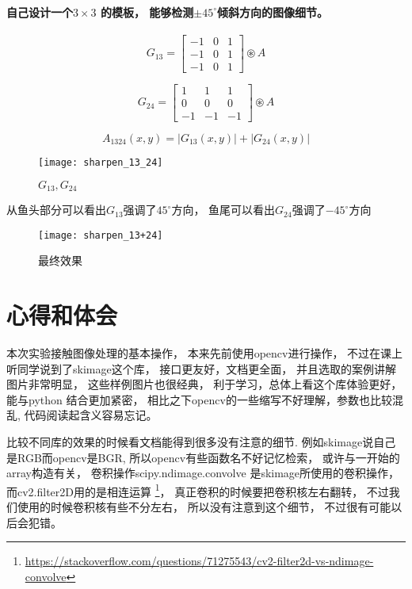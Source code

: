 \documentclass{myreport}
\begin{document}
      \paragraph{自己设计一个$3 \times 3$ 的模板，
        能够检测$ \pm 45^\circ$倾斜方向的图像细节。}
        $$
          G_{13} = \begin{bmatrix}
              -1 & 0 & 1 \\
              -1 & 0 & 1 \\
              -1 & 0 & 1
          \end{bmatrix}
          \circledast A 
        $$
        
        $$
          G_{24} = \begin{bmatrix}
              1 & 1 & 1 \\
              0 & 0 & 0 \\
              -1 & -1 & -1
          \end{bmatrix}
          \circledast A 
        $$
        
        $$
          A_{1324}(x,y) = |G_{13}(x,y)| + |G_{24}(x,y)| 
        $$



        \begin{figure}[H]
          \centering
          \texttt{[image: sharpen\_13\_24]}
          \caption{$G_{13}, G_{24}$}
          \label{fig:sharpen_13_24}
        \end{figure}
        从鱼头部分可以看出$G_{13}$强调了$45^\circ$方向，
        鱼尾可以看出$G_{24}$强调了$-45^\circ$方向

        \begin{figure}[H]
          \centering
          \texttt{[image: sharpen\_13+24]}
          \caption{最终效果}
          \label{fig:sharpen_13+24}
        \end{figure}
\section{心得和体会}
  本次实验接触图像处理的基本操作，
  本来先前使用opencv进行操作，
  不过在课上听同学说到了skimage这个库，
  接口更友好，文档更全面，
  并且选取的案例讲解图片非常明显，
  这些样例图片也很经典，
  利于学习，总体上看这个库体验更好，
  能与python 结合更加紧密，
  相比之下opencv的一些缩写不好理解，参数也比较混乱,
  代码阅读起含义容易忘记。

  比较不同库的效果的时候看文档能得到很多没有注意的细节.
  例如skimage说自己是RGB而opencv是BGR,
  所以opencv有些函数名不好记忆检索，
  或许与一开始的array构造有关，
  卷积操作scipy.ndimage.convolve 
  是skimage所使用的卷积操作，
  而cv2.filter2D用的是相连运算
  \footnote{\url{https://stackoverflow.com/questions/71275543/cv2-filter2d-vs-ndimage-convolve}}，
  真正卷积的时候要把卷积核左右翻转，
  不过我们使用的时候卷积核有些不分左右，
  所以没有注意到这个细节，
  不过很有可能以后会犯错。
\end{document}
